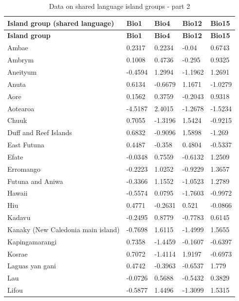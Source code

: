 \documentclass[draft,10pt]{article} %
\begin{document}
\begin{landscape}
\begin{longtable}{| p{2.6cm} |  p{2cm} | p{2cm}  | p{2cm}  | p{2cm}|}

\caption{{Data on shared language island groups - part 2}} 
\label{shared_language_groups_table_2} \\
\hline
\textbf{Island group (shared language)} & \textbf{Bio1} & \textbf{Bio4} & \textbf{Bio12} & \textbf{Bio15} \\ \hline

\endfirsthead

\hline
\textbf{Island group} & \textbf{Bio1} & \textbf{Bio4} & \textbf{Bio12} & \textbf{Bio15} \\ \hline
\endhead
Ambae&0.2317&0.2234&-0.04&0.6743\\ \hline
Ambrym&0.1008&0.4736&-0.295&0.9325\\ \hline
Aneityum&-0.4594&1.2994&-1.1962&1.2691\\ \hline
Anuta&0.6134&-0.6679&1.1671&-1.0279\\ \hline
Aore&0.1562&0.3759&-0.2043&0.9318\\ \hline
Aotearoa&-4.5187&2.4015&-1.2678&-1.5234\\ \hline
Chuuk&0.7055&-1.3196&1.5424&-0.9215\\ \hline
Duff and Reef Islands&0.6832&-0.9096&1.5898&-1.269\\ \hline
East Futuna&0.4487&-0.358&0.4804&-0.5337\\ \hline
Efate&-0.0348&0.7559&-0.6132&1.2509\\ \hline
Erromango&-0.2223&1.0252&-0.9229&1.3657\\ \hline
Futuna and Aniwa&-0.3366&1.1552&-1.0523&1.2789\\ \hline
Hawaii&-0.5574&0.0795&-1.7603&-0.9972\\ \hline
Hiu&0.4771&-0.2631&0.521&-0.0866\\ \hline
Kadavu&-0.2495&0.8779&-0.7783&0.6145\\ \hline
Kanaky (New Caledonia main island)&-0.7698&1.6115&-1.4999&1.5655\\ \hline
Kapingamarangi&0.7358&-1.4459&-0.1607&-0.6397\\ \hline
Kosrae&0.7072&-1.4114&1.9197&-0.6973\\ \hline
Laguas yan gani&0.4742&-0.3963&-0.6537&1.779\\ \hline
Lau&-0.0726&0.5688&-0.5432&0.3829\\ \hline
Lifou&-0.5877&1.4496&-1.3099&1.5315\\ \hline

\end{longtable}
\end{landscape}
\end{document}
